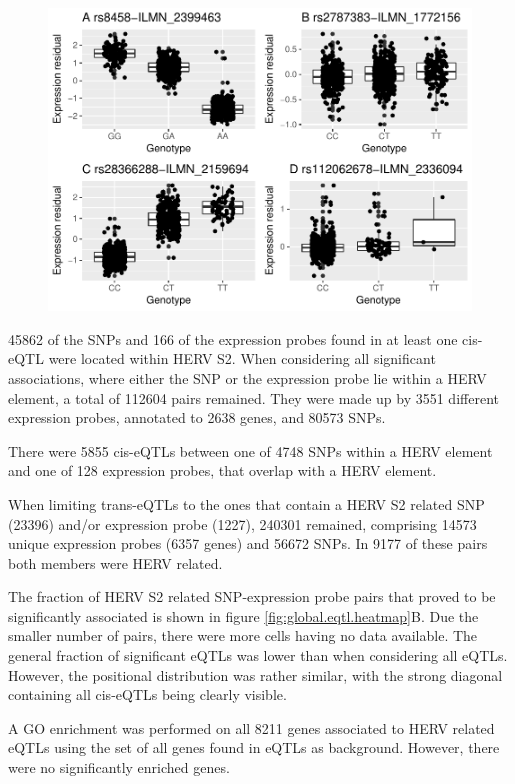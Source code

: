 \documentclass[a4paper,12pt,twoside,openright]{article}
\begin{document}
\begin{figure}[tb]
	\includegraphics[scale = 1, keepaspectratio = true]{../figures/best_worst_eqtl_boxplots.pdf}  
	\caption{}
    \label{fig:best.worst.eqtl.boxplot}
\end{figure}

45862 of the SNPs and 166 of the expression probes found in at least one cis-eQTL were located within HERV S2. When considering all significant associations, where either the SNP or the expression probe lie within a HERV element, a total of 112604 pairs remained. They were made up by 3551 different expression probes, annotated to 2638 genes, and 80573 SNPs. 

There were 5855 cis-eQTLs between one of 4748 SNPs within a HERV element and one of 128 expression probes, that overlap with a HERV element. 

When limiting trans-eQTLs to the ones that contain a HERV S2 related SNP (23396) and/or expression probe (1227), 240301 remained, comprising 14573 unique expression probes (6357 genes) and 56672 SNPs. In 9177 of these pairs both members were HERV related. 

The fraction of HERV S2 related SNP-expression probe pairs that proved to be significantly associated is shown in figure \ref{fig:global.eqtl.heatmap}B. Due the smaller number of pairs, there were more cells having no data available. The general fraction of significant eQTLs was lower than when considering all eQTLs. However, the positional distribution was rather similar, with the strong diagonal containing all cis-eQTLs being clearly visible.  

A GO enrichment was performed on all 8211 genes associated to HERV related eQTLs using the set of all genes found in eQTLs as background. However, there were no significantly enriched genes. 
\end{document}
